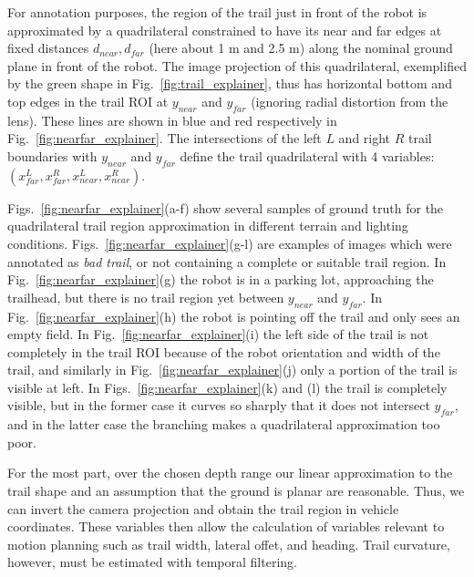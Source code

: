 \documentclass[letterpaper, 10 pt, conference]{ieeeconf}  %
\newcommand{\comment}[1]{\textcolor{red}{#1}}
\newcommand{\TrailNearDepth}{d_{near}}
\newcommand{\TrailFarDepth}{d_{far}}
\newcommand{\TrailNearLine}{y_{near}}
\newcommand{\TrailFarLine}{y_{far}}
\begin{document}
For annotation purposes, the region of the trail just in front of the
robot is approximated by a quadrilateral constrained to have its near
and far edges at fixed distances $\TrailNearDepth, \TrailFarDepth$ (here about 1 m and
2.5 m) along the nominal ground plane in front of the robot.  The
image projection of this quadrilateral, exemplified by the green shape
in Fig.~\ref{fig:trail_explainer}, thus has horizontal bottom and top
edges in the trail ROI at $\TrailNearLine$ and $\TrailFarLine$ (ignoring radial
distortion from the lens).  These lines are shown in blue and red
respectively in Fig.~\ref{fig:nearfar_explainer}.  The intersections
of the left $L$ and right $R$ trail boundaries with $\TrailNearLine$ and
$\TrailFarLine$ define the trail quadrilateral with 4 variables:
$(x^{L}_{far}, x^{R}_{far}, x^{L}_{near}, x^{R}_{near})$.

Figs.~\ref{fig:nearfar_explainer}(a-f) show several samples of ground truth for the
quadrilateral trail region approximation in different terrain and
lighting conditions.  Figs.~\ref{fig:nearfar_explainer}(g-l) are
examples of images which were annotated as \textit{bad trail}, or not
containing a complete or suitable trail region.  In
Fig.~\ref{fig:nearfar_explainer}(g) the robot is in a parking lot,
approaching the trailhead, but there is no trail region yet between
$y_{near}$ and $y_{far}$.  In Fig.~\ref{fig:nearfar_explainer}(h) the
robot is pointing off the trail and only sees an empty field.  In
Fig.~\ref{fig:nearfar_explainer}(i) the left side of the trail is not
completely in the trail ROI because of the robot orientation and width of the trail, and similarly in
Fig.~\ref{fig:nearfar_explainer}(j) only a portion of the trail is
visible at left.  In Figs.~\ref{fig:nearfar_explainer}(k) and (l) the
trail is completely visible, but in the former case it curves so
sharply that it does not intersect $y_{far}$, and in the latter case
the branching makes a quadrilateral approximation too poor.

For the most part, over the chosen depth range our linear approximation to the trail
shape and an assumption that the ground is planar are reasonable.
Thus, we can invert the camera projection
and obtain the trail region in vehicle coordinates.  These variables
then allow the calculation of variables relevant to motion planning
such as trail width, lateral offet, and heading.  Trail curvature, however, must
be estimated with temporal filtering.


\end{document}
